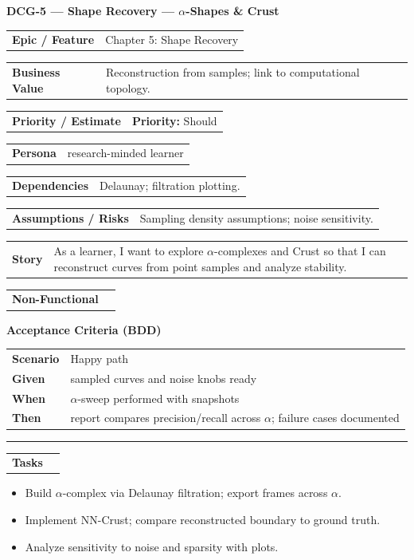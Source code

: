 \documentclass[11pt,a4paper]{article}
\makeatletter
\newcommand{\FieldRow}[2]{%
  \noindent\begin{tabularx}{\linewidth}{@{}>{\bfseries}l X@{}}#1 & #2\\\end{tabularx}%
}
\newcommand{\CardDivider}{\par\noindent\color{CardBorder}\rule{\linewidth}{0.4pt}\par\noindent\color{black}}
\newcommand{\StoryHeader}[2]{%
  {\large\bfseries \textcolor{CardTitle}{#1} --- #2}
}
\newcommand{\BDD}[4]{%
  \par\noindent\textbf{Acceptance Criteria (BDD)}\par\nobreak
  \noindent\begin{tabularx}{\linewidth}{@{}>{\bfseries}l X@{}}
  Scenario & #1\\
  Given & #2\\
  When & #3\\
  Then & #4\\
  \end{tabularx}\par
}
\newenvironment{TaskList}{%
  \begin{itemize}[leftmargin=1.25em,label=\(\square\)]
}{\end{itemize}}
\makeatother
\begin{document}
\begin{StoryCardBox}
\StoryHeader{DCG-5}{Shape Recovery — $\alpha$-Shapes \& Crust}\\[0.4em]
\FieldRow{Epic / Feature}{Chapter 5: Shape Recovery}
\FieldRow{Business Value}{Reconstruction from samples; link to computational topology.}
\FieldRow{Priority / Estimate}{\textbf{Priority:} Should \quad \nfchip{SP: 5}}
\FieldRow{Persona}{research-minded learner}
\FieldRow{Dependencies}{Delaunay; filtration plotting.}
\FieldRow{Assumptions / Risks}{Sampling density assumptions; noise sensitivity.}
\FieldRow{Story}{As a learner, I want to explore $\alpha$-complexes and Crust so that I can reconstruct curves from point samples and analyze stability.}

\FieldRow{Non-Functional}{\nfchip{Rigor} \nfchip{Reproducibility} \nfchip{Clarity}}

\BDD{Happy path}{sampled curves and noise knobs ready}{$\alpha$-sweep performed with snapshots}{report compares precision/recall across $\alpha$; failure cases documented}

\CardDivider
\FieldRow{\large Tasks}{}
\begin{TaskList}
  \item Build $\alpha$-complex via Delaunay filtration; export frames across $\alpha$.
  \item Implement NN-Crust; compare reconstructed boundary to ground truth.
  \item Analyze sensitivity to noise and sparsity with plots.
\end{TaskList}
\end{StoryCardBox}
\end{document}
